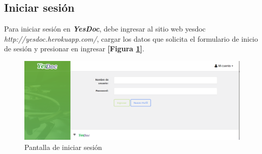 \documentclass[a4paper,12pt]{article}
\begin{document}
\subsection{Iniciar sesión}
Para iniciar sesión en \textbf{\textit{YesDoc}}, debe ingresar al sitio web yesdoc \textit{http://yesdoc.herokuapp.com/}, cargar los datos que solicita el formulario de inicio de sesión y presionar en ingresar \textbf{[Figura \ref{mu-iniciar_sesion}]}.
 \begin{figure}
 	\centering
 	\includegraphics[width=.8\textwidth]{img/manual_de_usuario/iniciar_sesion}
 	\caption{Pantalla de iniciar sesión}
 	\label{mu-iniciar_sesion}
 \end{figure}
\end{document}

